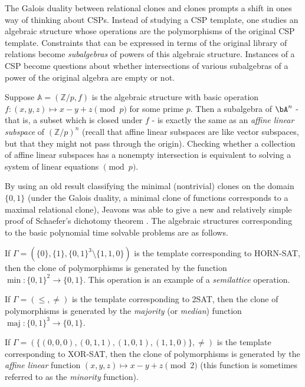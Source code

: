 The Galois duality between relational clones and clones prompts a shift in ones way of thinking about CSPs. Instead of studying a CSP template, one studies an algebraic structure whose operations are the polymorphisms of the original CSP template. Constraints that can be expressed in terms of the original library of relations become \emph{subalgebras} of powers of this algebraic structure. Instances of a CSP become questions about whether intersections of various subalgebras of a power of the original algebra are empty or not.

\begin{ex} Suppose $\mathbb{A} = (\mathbb{Z}/p, f)$ is the algebraic structure with basic operation $f : (x,y,z) \mapsto x - y + z \pmod{p}$ for some prime $p$. Then a subalgebra of $\bA^n$ - that is, a subset which is closed under $f$ - is exactly the same as an \emph{affine linear subspace} of $(\mathbb{Z}/p)^n$ (recall that affine linear subspaces are like vector subspaces, but that they might not pass through the origin). Checking whether a collection of affine linear subspaces has a nonempty intersection is equivalent to solving a system of linear equations $\pmod{p}$.
\end{ex}

By using an old result classifying the minimal (nontrivial) clones on the domain $\{0,1\}$ (under the Galois duality, a minimal clone of functions corresponds to a maximal relational clone), Jeavons \cite{jeavons} was able to give a new and relatively simple proof of Schaefer's dichotomy theorem \cite{schaefer}. The algebraic structures corresponding to the basic polynomial time solvable problems are as follows.

\begin{ex} If $\Gamma = (\{0\}, \{1\}, \{0,1\}^3\setminus \{1,1,0\})$ is the template corresponding to HORN-SAT, then the clone of polymorphisms is generated by the function $\min : \{0,1\}^2 \rightarrow \{0,1\}$. This operation is an example of a \emph{semilattice} operation.
\end{ex}

\begin{ex} If $\Gamma = (\le, \ne)$ is the template corresponding to 2SAT, then the clone of polymorphisms is generated by the \emph{majority} (or \emph{median}) function $\operatorname{maj} : \{0,1\}^3 \rightarrow \{0,1\}$.
\end{ex}

\begin{ex} If $\Gamma = (\{(0,0,0), (0,1,1), (1,0,1), (1,1,0)\}, \ne)$ is the template corresponding to XOR-SAT, then the clone of polymorphisms is generated by the \emph{affine linear} function $(x,y,z) \mapsto x-y+z \pmod{2}$ (this function is sometimes referred to as the \emph{minority} function).
\end{ex}

